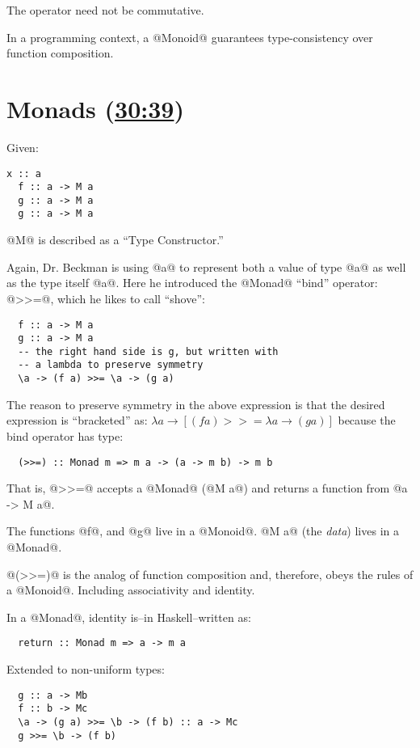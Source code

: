 The operator need not be commutative.

In a programming context, a @Monoid@ guarantees type-consistency over function composition.

\section{Monads (\href{https://youtu.be/ZhuHCtR3xq8?t=7m50s}{30:39})}

Given:
\begin{lstlisting}[frame=trBL, frameround=fttt, framerule=1pt, label=defM]
  x :: a
  f :: a -> M a
  g :: a -> M a
  g :: a -> M a
\end{lstlisting}
@M@ is described as a ``Type Constructor.''

Again, Dr. Beckman is using @a@ to represent both a value of type @a@ as well
as the type itself @a@.  Here he introduced the @Monad@ ``bind'' operator:
@>>=@, which he likes to call ``shove'':
\begin{lstlisting}
  f :: a -> M a
  g :: a -> M a
  -- the right hand side is g, but written with
  -- a lambda to preserve symmetry
  \a -> (f a) >>= \a -> (g a)
\end{lstlisting}

The reason to preserve symmetry in the above expression is that the desired expression is ``bracketed'' as:
\begin{math}
  \lambda a \rightarrow [(f a) >>= \lambda a \rightarrow (g a)]
\end{math}
because the bind operator has type:
\begin{lstlisting}
  (>>=) :: Monad m => m a -> (a -> m b) -> m b
\end{lstlisting}
That is, @>>=@ accepts a @Monad@ (@M a@) and returns a function from
@a -> M a@.

The functions @f@, and @g@ live in a @Monoid@.  @M a@ (the \emph{data}) lives
in a @Monad@.

@(>>=)@ is the analog of function composition and, therefore, obeys the rules of a @Monoid@.  Including associativity and identity.

In a @Monad@, identity is--in Haskell--written as:
\begin{lstlisting}
  return :: Monad m => a -> m a
\end{lstlisting}

Extended to non-uniform types:
\begin{lstlisting}
  g :: a -> Mb
  f :: b -> Mc
  \a -> (g a) >>= \b -> (f b) :: a -> Mc
  g >>= \b -> (f b)
\end{lstlisting}
